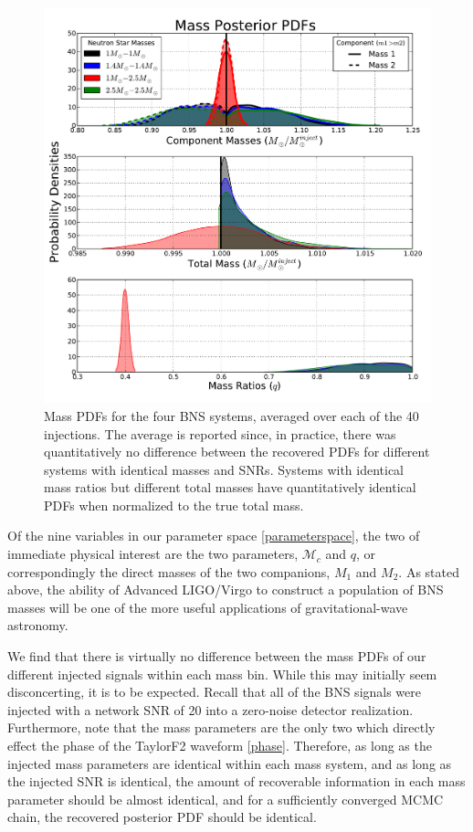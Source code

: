 \documentclass[11pt,a4paper]{emulateapj} 
\newcommand{\chmass}{\mathcal{M}_c}
\begin{document}
\begin{figure}[ht!]
  \centering \includegraphics[trim=2cm 0cm 2cm 0cm,
    clip=false,scale=0.7]{newMasses.pdf}
 \caption{Mass PDFs for the four BNS systems, averaged over each of
   the 40 injections.  The average is reported since, in practice,
   there was quantitatively no difference between the recovered PDFs
   for different systems with identical masses and SNRs.  Systems with
   identical mass ratios but different total masses have
   quantitatively identical PDFs when normalized to the true total
   mass.}
  \label{metaMassPDFs}
\end{figure}

Of the nine variables in our parameter space \eqref{parameterspace},
the two of immediate physical interest are the two parameters,
$\chmass$ and $q$, or correspondingly the direct masses of the two
companions, $M_1$ and $M_2$.  As stated above, the ability of Advanced
LIGO/Virgo to construct a population of BNS masses will be one of the
more useful applications of gravitational-wave astronomy.

We find that there is virtually no difference between the mass PDFs of
our different injected signals within each mass bin.  While this may
initially seem disconcerting, it is to be expected.  Recall that all
of the BNS signals were injected with a network SNR of 20 into a
zero-noise detector realization.  Furthermore, note that the mass
parameters are the only two which directly effect the phase of the
TaylorF2 waveform \eqref{phase}.  Therefore, as long as the injected
mass parameters are identical within each mass system, and as long as
the injected SNR is identical, the amount of recoverable information
in each mass parameter should be almost identical, and for a
sufficiently converged MCMC chain, the recovered posterior PDF should
be identical.
\end{document}
